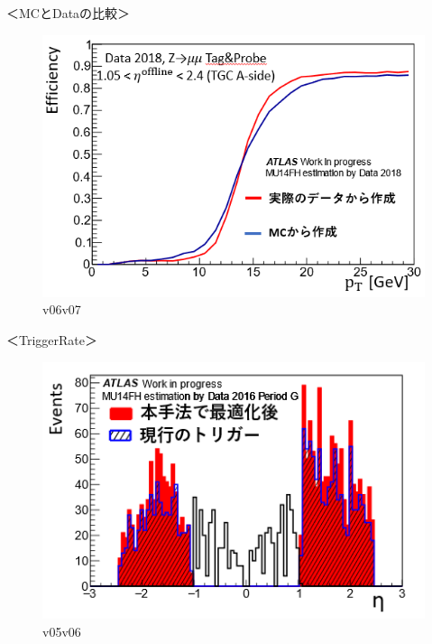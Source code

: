 ＜MCとDataの比較＞
\begin{figure}[tb]
  \centering
  \includegraphics[clip, width=14cm]{fig/4/hikaku_v06_v07.png}
  \caption{v06v07}
  \label{fig:Resolution}
\end{figure}

＜TriggerRate＞
\begin{figure}[tb]
  \centering
  \includegraphics[clip, width=14cm]{fig/4/rate_v05_v06.png}
  \caption{v05v06}
  \label{fig:Resolution}
\end{figure}

